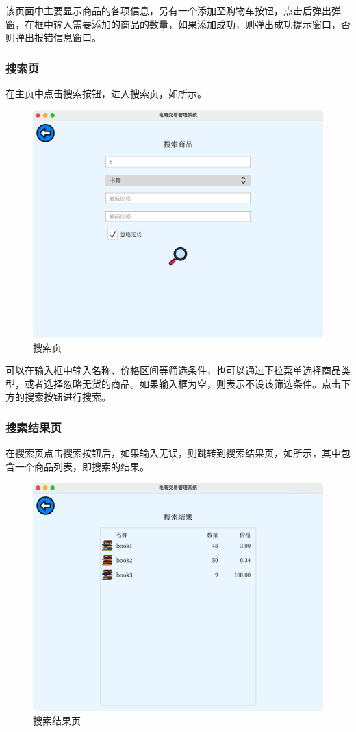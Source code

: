 \documentclass[lang=cn,11pt,a4paper,cite=authornum]{paper}
\begin{document}
该页面中主要显示商品的各项信息，另有一个添加至购物车按钮，点击后弹出弹窗，在框中输入需要添加的商品的数量，如果添加成功，则弹出成功提示窗口，否则弹出报错信息窗口。

\subsubsection{搜索页}

在主页中点击搜索按钮，进入搜索页，如所示。

\begin{figure}[htbp]
    \centering
    \includegraphics[width=0.7\linewidth]{./Images/search.png}
    \caption{搜索页\label{fig:search}}
\end{figure}

可以在输入框中输入名称、价格区间等筛选条件，也可以通过下拉菜单选择商品类型，或者选择忽略无货的商品。如果输入框为空，则表示不设该筛选条件。点击下方的搜索按钮进行搜索。

\subsubsection{搜索结果页}

在搜索页点击搜索按钮后，如果输入无误，则跳转到搜索结果页，如所示，其中包含一个商品列表，即搜索的结果。

\begin{figure}[htbp]
    \centering
    \includegraphics[width=0.7\linewidth]{./Images/searchres.png}
    \caption{搜索结果页\label{fig:searchres}}
\end{figure}
\end{document}
